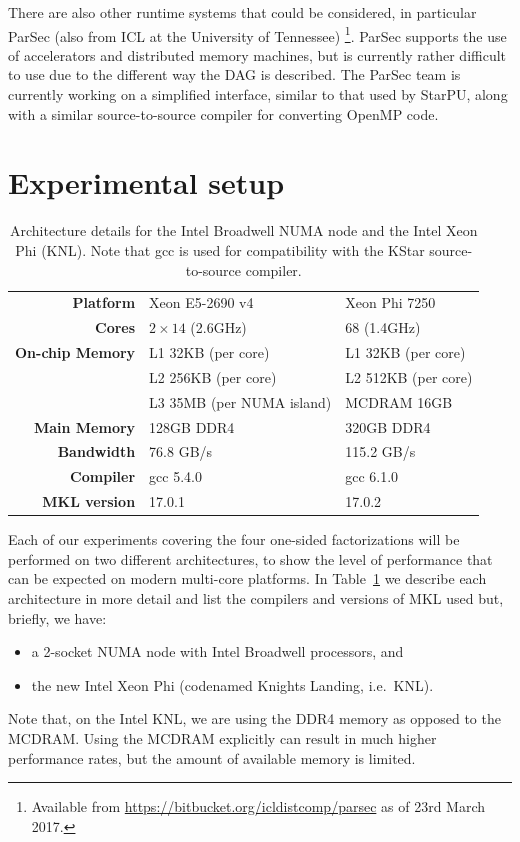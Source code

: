 \documentclass[a4paper,12pt]{article}
\begin{document}
There are also other runtime systems that could be considered,
in particular ParSec (also from ICL at the University of Tennessee)%
\footnote{Available from
  \url{https://bitbucket.org/icldistcomp/parsec} as of 23rd March 2017.}.
ParSec supports the use of accelerators and distributed memory machines,
but is currently rather difficult to use due to the
different way the DAG is described.
The ParSec team is currently working on a simplified interface,
similar to that used by StarPU,
along with a similar source-to-source compiler for converting OpenMP code.

\section{Experimental setup}
\label{sec.arch}

\begin{table}[t]
  \centering
  \caption{Architecture details for the Intel Broadwell NUMA node and
    the Intel Xeon Phi (KNL).
    Note that gcc is used for compatibility with the KStar
    source-to-source compiler.}
  \vspace{.5em}
  \begin{tabular}{|r | l | l |}
    \hline
    \textbf{Platform} & Xeon E5-2690 v4 & Xeon Phi 7250\\
    \textbf{Cores}    & $2 \times 14$ (2.6GHz) & 68 (1.4GHz)\\
    \textbf{On-chip Memory} & L1 32KB (per core) & L1 32KB (per core)\\
                      & L2 256KB (per core) & L2 512KB (per core)\\
                      & L3 35MB (per NUMA island)  & MCDRAM 16GB\\
    \textbf{Main Memory} & 128GB DDR4 & 320GB DDR4\\
    \textbf{Bandwidth} & 76.8 GB/s & 115.2 GB/s\\
    \textbf{Compiler} & gcc 5.4.0 & gcc 6.1.0\\
    \textbf{MKL version} & 17.0.1 & 17.0.2\\
    \hline
  \end{tabular}
  \label{tab.arch}
\end{table}

Each of our experiments covering the four one-sided factorizations
will be performed on two different architectures,
to show the level of performance that can be expected on
modern multi-core platforms.
In Table~\ref{tab.arch} we describe each architecture in more detail
and list the compilers and versions of MKL used but,
briefly, we have:
\begin{itemize}
\item a 2-socket NUMA node with Intel Broadwell processors, and
\item the new Intel Xeon Phi (codenamed Knights Landing, i\@.e\@.~KNL).
\end{itemize}
Note that, on the Intel KNL,
we are using the DDR4 memory as opposed to the MCDRAM.
Using the MCDRAM explicitly can result in much higher performance
rates,
but the amount of available memory is limited.
\end{document}
